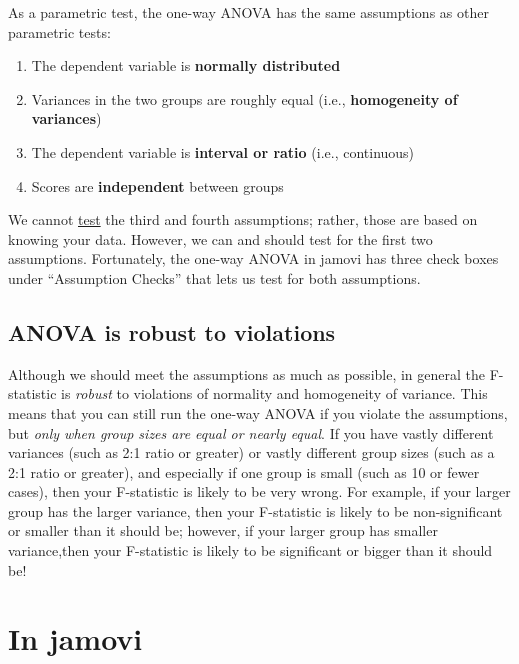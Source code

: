 \documentclass[
]{book}
\begin{document}
As a parametric test, the one-way ANOVA has the same assumptions as other parametric tests:

\begin{enumerate}
\def\labelenumi{\arabic{enumi}.}
\item
  The dependent variable is \textbf{normally distributed}
\item
  Variances in the two groups are roughly equal (i.e., \textbf{homogeneity of variances})
\item
  The dependent variable is \textbf{interval or ratio} (i.e., continuous)
\item
  Scores are \textbf{independent} between groups
\end{enumerate}

We cannot \underline{test} the third and fourth assumptions; rather, those are based on knowing your data. However, we can and should test for the first two assumptions. Fortunately, the one-way ANOVA in jamovi has three check boxes under ``Assumption Checks'' that lets us test for both assumptions.

\hypertarget{anova-is-robust-to-violations}{%
\subsection{ANOVA is robust to violations}\label{anova-is-robust-to-violations}}

Although we should meet the assumptions as much as possible, in general the F-statistic is \emph{robust} to violations of normality and homogeneity of variance. This means that you can still run the one-way ANOVA if you violate the assumptions, but \emph{only when group sizes are equal or nearly equal}. If you have vastly different variances (such as 2:1 ratio or greater) or vastly different group sizes (such as a 2:1 ratio or greater), and especially if one group is small (such as 10 or fewer cases), then your F-statistic is likely to be very wrong. For example, if your larger group has the larger variance, then your F-statistic is likely to be non-significant or smaller than it should be; however, if your larger group has smaller variance,then your F-statistic is likely to be significant or bigger than it should be!

\hypertarget{in-jamovi-1}{%
\section{In jamovi}\label{in-jamovi-1}}
\end{document}
